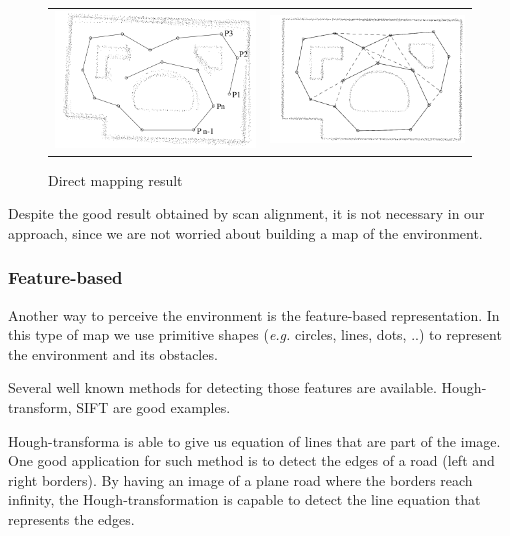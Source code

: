 \begin{figure}[h]
\centering
	\begin{tabular}{lr}\\
		\includegraphics[width=0.5\columnwidth]{img/fig:mapping:direct:a} &
		\includegraphics[width=0.5\columnwidth]{img/fig:mapping:direct:b}
	\end{tabular}
	\caption{Direct mapping result}
	\label{fig:mapping:direct:result}
\end{figure}

Despite the good result obtained by scan alignment, it is not necessary in our approach, since we are not worried about building a map of the environment. 

\subsubsection{Feature-based}

Another way to perceive the environment is the feature-based representation. In this type of map we use primitive shapes (\textit{e.g.} circles, lines, dots, ..) to represent the environment and its obstacles.

Several well known methods for detecting those features are available. Hough-transform, SIFT are good examples. 

Hough-transforma is able to give us equation of lines that are part of the image. One good application for such method is to detect the edges of a road (left and right borders). By having an image of a plane road where the borders reach infinity, the Hough-transformation is capable to detect the line equation that represents the edges. \cite{Ballard:1987:GHT:33517.33574}


